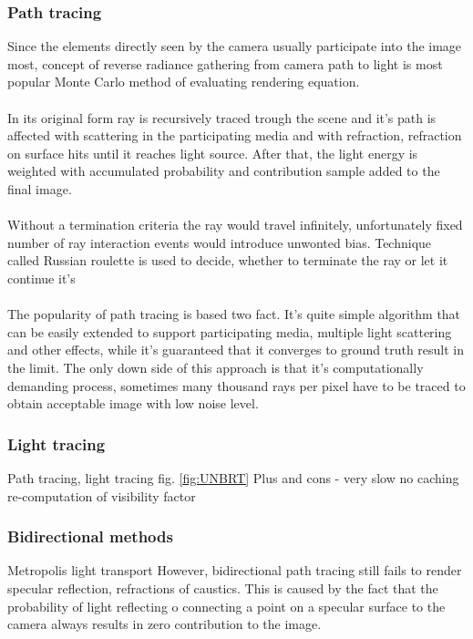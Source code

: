 \subsubsection{Path tracing}
Since the elements directly seen by the camera usually participate into the image most, concept of reverse radiance gathering from camera path to light is most popular Monte Carlo method of evaluating rendering equation. 
\\
\\
In its original form ray is recursively traced trough the scene and it's path is affected with scattering in the participating media and with refraction, refraction on surface hits until it reaches light source. After that, the light energy is weighted with accumulated probability and contribution sample added to the final image. 
\\
\\
Without a termination criteria the ray would travel infinitely, unfortunately fixed number of ray interaction events would introduce unwonted bias. Technique called Russian roulette is used to decide, whether to terminate the ray or let it continue it's
\\
\\
The popularity of path tracing is based two fact. It's quite simple algorithm that can be easily extended to support participating media, multiple light scattering and other effects, while it's guaranteed that it converges to ground truth result in the limit. The only down side of this approach is that it's computationally demanding process, sometimes many thousand rays per pixel have to be traced to obtain acceptable image with low noise level.


\subsubsection{Light tracing}

Path tracing, light tracing fig. \ref{fig:UNBRT}
Plus and cons - very slow no caching re-computation of visibility factor

\subsubsection{Bidirectional methods}

Metropolis light transport \cite{Veach97metropolislight}
However, bidirectional path tracing still fails to render specular reflection, refractions of caustics. This is caused by the fact that the probability of light reflecting o connecting a point on a specular surface to the camera always results in zero contribution to the image.


